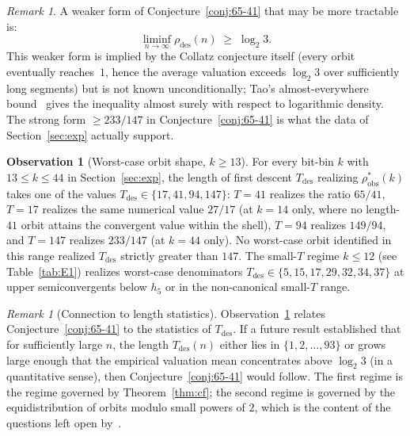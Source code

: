 \documentclass[11pt,a4paper]{article}
\theoremstyle{definition}
\newtheorem{observation}[theorem]{Observation}
\theoremstyle{remark}
\newtheorem{remark}[theorem]{Remark}
\begin{document}
\begin{remark}\label{rem:weaker}
A weaker form of Conjecture~\ref{conj:65-41} that may be more
tractable is:
\[
  \liminf_{n \to \infty} \rho_{\mathrm{des}}(n) \;\geq\; \log_2 3.
\]
This weaker form is implied by the Collatz conjecture itself
(every orbit eventually reaches~$1$, hence the average valuation
exceeds $\log_2 3$ over sufficiently long segments) but is not known
unconditionally; Tao's almost-everywhere bound~\cite{Tao2022} gives
the inequality almost surely with respect to logarithmic density.
The strong form $\geq 233/147$ in Conjecture~\ref{conj:65-41} is what
the data of Section~\ref{sec:exp} actually support.
\end{remark}

\begin{observation}[Worst-case orbit shape, $k \geq 13$]\label{obs:shape}
For every bit-bin $k$ with $13 \leq k \leq 44$ in
Section~\ref{sec:exp}, the length of first descent $T_{\mathrm{des}}$
realizing $\rho^{*}_{\mathrm{obs}}(k)$ takes one of the values
$T_{\mathrm{des}} \in \{17, 41, 94, 147\}$: $T = 41$ realizes the
ratio $65/41$, $T = 17$ realizes the same numerical value $27/17$
(at $k = 14$ only, where no length-$41$ orbit attains the convergent
value within the shell), $T = 94$ realizes $149/94$, and $T = 147$
realizes $233/147$ (at $k = 44$ only).  No worst-case orbit
identified in this range realized $T_{\mathrm{des}}$ strictly
greater than $147$.  The small-$T$ regime $k \leq 12$ (see
Table~\ref{tab:E1}) realizes worst-case denominators
$T_{\mathrm{des}} \in \{5, 15, 17, 29, 32, 34, 37\}$ at upper
semiconvergents below $h_5$ or in the non-canonical small-$T$ range.
\end{observation}

\begin{remark}[Connection to length statistics]
Observation~\ref{obs:shape} relates Conjecture~\ref{conj:65-41} to
the statistics of $T_{\mathrm{des}}$.  If a future result established
that for sufficiently large $n$, the length $T_{\mathrm{des}}(n)$
either lies in $\{1, 2, \ldots, 93\}$ or grows large enough that
the empirical valuation mean concentrates above $\log_2 3$ (in a
quantitative sense), then Conjecture~\ref{conj:65-41} would follow.
The first regime is the regime governed by Theorem~\ref{thm:cf};
the second regime is governed by the equidistribution of orbits
modulo small powers of $2$, which is the content of the questions
left open by~\cite{Tao2022}.
\end{remark}
\end{document}
